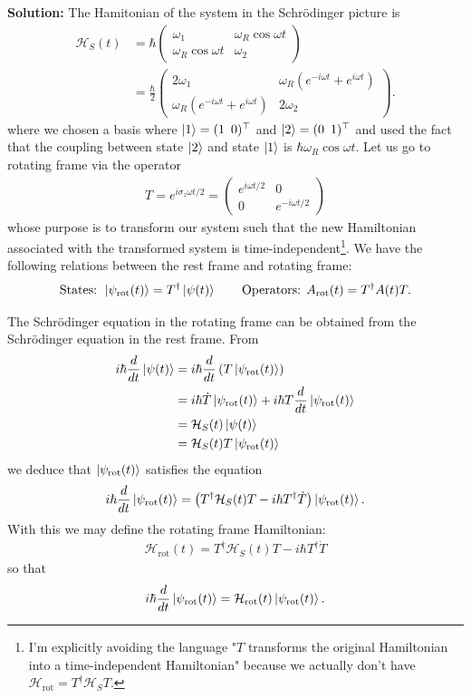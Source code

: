 \documentclass{book}
\theoremstyle{definition}
\newcommand{\psirot}{\ket{\psi_\text{rot}(t)} }
\newcommand{\ham}{\mathcal{H}}
\newcommand{\f}[2]{\frac{#1}{#2}}
\newcommand{\lp}{\left(}
\newcommand{\rp}{\right)}
\begin{document}
\noindent  \textbf{Solution:} The Hamitonian of the system in the Schr\"{o}dinger picture is 
	\begin{align*}
		\ham_S(t) &= \hbar \begin{pmatrix}
			\omega_1 & \omega_R \cos \omega t \\ \omega_R \cos\omega t & \omega_2
		\end{pmatrix} \\
		&= \f{\hbar}{2} \begin{pmatrix}
			2\omega_1 & \omega_R (e^{-i\omega t} + e^{i\omega t}) \\ \omega_R (e^{-i\omega t} + e^{i\omega t}) & 2\omega_2
		\end{pmatrix}.
	\end{align*}
	where we chosen a basis where $\ket{1} = (1 \,\,\, 0)^\top$ and $\ket{2} = (0 \,\,\, 1)^\top$ and used the fact that the coupling between state $\ket{2}$ and state $\ket{1}$ is $\hbar \omega_R \cos\omega t$. Let us go to rotating frame via the operator
	\begin{align*}
		T = e^{i\sigma_z \omega t/2} = \begin{pmatrix}
			e^{i\omega t/2} &  0 \\0  & e^{-i\omega t/2}
		\end{pmatrix} 
	\end{align*}
	whose purpose is to transform our system such that the new Hamiltonian associated with the transformed system is time-independent\footnote{I'm explicitly avoiding the language "$T$ transforms the original Hamiltonian into a time-independent Hamiltonian" because we actually don't have $\ham_\text{rot} = T^\dagger \ham_S T$.}.  We have the following relations between the rest frame and rotating frame:
	\begin{align*}
		\text{States: } \ket{\psi_\text{rot}(t)} = T^\dagger \ket{\psi(t)} \quad\quad \text{Operators: }  A_\text{rot}(t) = T^\dagger A(t) T.
	\end{align*}
	
	The Schr\"{o}dinger equation in the rotating frame can be obtained from the Schr\"{o}dinger equation in the rest frame. From
	\begin{align*}
		i\hbar \f{d}{dt}\ket{\psi(t)} 
		&= i\hbar \f{d}{dt}\lp T\psirot \rp \\
		&= i\hbar \dot T \psirot + i\hbar T \f{d}{dt}\psirot\\
		&= \ham_S(t)\ket{\psi(t)} \\
		&= \ham_S(t) T\psirot
	\end{align*}
	we deduce that $\psirot$ satisfies the equation
	\begin{align*}
		i\hbar \f{d}{dt}\psirot = \lp T^\dagger \ham_S(t) T -i\hbar T^\dagger \dot T \rp \psirot.
	\end{align*} 
	With this we may define the rotating frame Hamiltonian:
	\begin{align*}
		\ham_\text{rot}(t) = T^\dagger \ham_S(t) T -i\hbar T^\dagger \dot T
	\end{align*}
	so that
	\begin{align*}
		i\hbar \f{d}{dt}\psirot = \ham_\text{rot}(t) \psirot.
	\end{align*}
\end{document}
